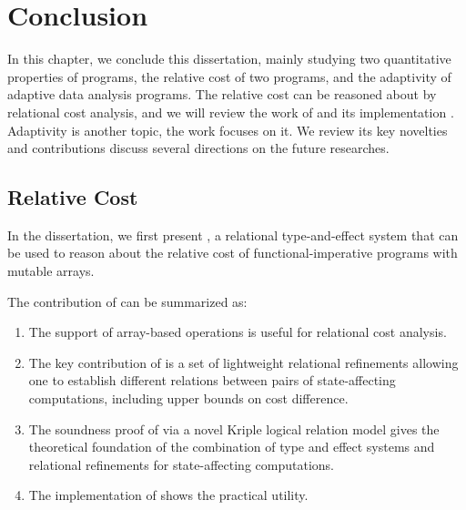 \chapter{Conclusion}
\label{ch:conclusion}

In this chapter, we conclude this dissertation, mainly studying two quantitative properties of programs, the relative cost of two programs, and the adaptivity of adaptive data analysis programs. The relative cost can be reasoned about by relational cost analysis, and we will review the work of {\Arel} and its implementation {\BIAREL}. Adaptivity is another topic, the work {\ADAPTSYSTEM} focuses on it.  We
review its key novelties and contributions discuss several directions on the future researches. 




\section{Relative Cost}
In the dissertation, we first present {\Arel}, a relational type-and-effect system that can
be used to reason about the relative cost of functional-imperative
programs with mutable arrays. 

The contribution of {\Arel} can be summarized as:
\begin{enumerate}
   \item The support of array-based operations is useful for relational cost analysis.
    \item The key contribution of {\Arel} is a set of
lightweight relational refinements allowing one to establish different
relations between pairs of state-affecting computations, including
upper bounds on cost difference. 
\item The soundness proof of {\Arel} via a novel Kriple logical relation model gives the theoretical foundation of the combination of type and effect systems and relational refinements for state-affecting computations.
\item The implementation of {\Arel} shows the practical utility.
\end{enumerate}


